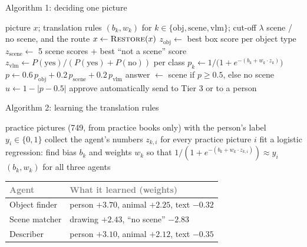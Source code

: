 \documentclass[aspectratio=169,11pt]{beamer}
\newcommand{\h}[1]{\textcolor{grey}{#1}}
\newcommand{\remark}[1]{\par\vspace{0.35cm}{\small\textcolor{grey}{#1}}}
\begin{document}
\begin{frame}{Algorithm 1: deciding one picture}
\small
\begin{algorithmic}[1]
\Require picture $x$; translation rules $(b_k, w_k)$ for $k \in \{\text{obj}, \text{scene}, \text{vlm}\}$; cut-off $\lambda$
\Ensure scene / no scene, and the route
\State $x \gets \textsc{Restore}(x)$ 
\State $z_{\text{obj}} \gets$ best box score per object type 
\State $z_{\text{scene}} \gets$ 5 scene scores + best ``not a scene'' score 
\State $z_{\text{vlm}} \gets P(\text{yes}) / (P(\text{yes}) + P(\text{no}))$ per class 
  \State $p_k \gets 1 / \big(1 + e^{-(b_k + w_k \cdot z_k)}\big)$ 
\EndFor
\State $p \gets 0.6\, p_{\text{obj}} + 0.2\, p_{\text{scene}} + 0.2\, p_{\text{vlm}}$
\State answer $\gets$ scene if $p \ge 0.5$, else no scene
\State $u \gets 1 - |p - 0.5|$ 
 \State approve automatically
\Else \State send to Tier 3 or to a person
\EndIf
\end{algorithmic}
\end{frame}

\begin{frame}{Algorithm 2: learning the translation rules}
\small
\begin{algorithmic}[1]
\Require practice pictures (749, from practice books only) with the person's label $y_i \in \{0, 1\}$
  \State collect the agent's numbers $z_{k,i}$ for every practice picture $i$
  \State fit a logistic regression: find bias $b_k$ and weights $w_k$ so that $1/(1+e^{-(b_k + w_k \cdot z_{k,i})}) \approx y_i$
\EndFor
\State \Return $(b_k, w_k)$ for all three agents
\end{algorithmic}
\vspace{0.4cm}
\begin{tabular}{@{}L{4.4cm} L{8.2cm}@{}}
\toprule
\h{Agent} & \h{What it learned (weights)}\\
\midrule
Object finder & person $+3.70$, animal $+2.25$, text $-0.32$\\
Scene matcher & drawing $+2.43$, ``no scene'' $-2.83$\\
Describer & person $+3.10$, animal $+2.12$, text $-0.35$\\
\bottomrule
\end{tabular}
\remark{Plus sign = pushes towards ``scene''. Nobody told it that a person is evidence of a scene; it learned it from the examples.}
\end{frame}
\end{document}
